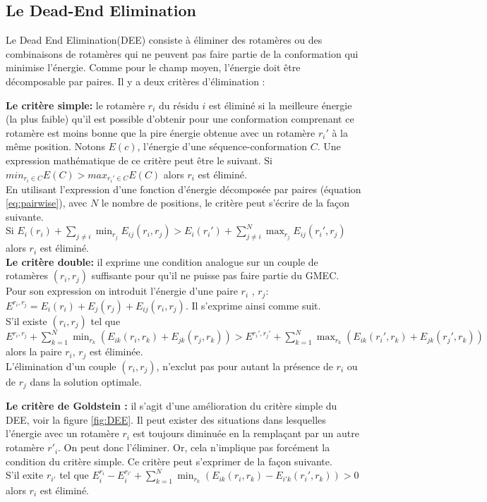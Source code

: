 \subsection{Le Dead-End Elimination}

Le \og Dead End Elimination\fg (DEE)  consiste à éliminer des rotamères ou des combinaisons de rotamères qui ne peuvent pas faire partie de la conformation qui minimise l'énergie. Comme pour le champ moyen, l'énergie doit être décomposable par paires. Il y a deux critères d'élimination \cite{Desmet92}:


\textbf{Le critère simple:} le rotamère $r_i$ du résidu $i$ est éliminé si la meilleure énergie (la plus faible) qu'il est possible d'obtenir pour une conformation comprenant ce rotamère est moins bonne que la pire énergie obtenue avec un rotamère $r_i'$  à la même position. Notons $E(c)$, l'énergie d'une séquence-conformation $C$. Une expression mathématique de ce critère peut être le suivant.
Si $min_{r_i \in C }E(C) > max_{r_i' \in C} E(C) $ alors $r_i$ est éliminé. \\
En utilisant l'expression d'une fonction d'énergie décomposée par paires (équation \vref{eq:pairwise}), avec $N$ le nombre de positions, le critère peut s'écrire de la façon suivante.\\
Si $E_i(r_i) + \sum_{j\neq i} \min_{r_j} E_{ij}(r_i,r_j) > E_i(r_i') + \sum_{j\neq i}^{N} \max_{r_j}E_{ij}(r_i',r_j)$ alors $r_i$ est éliminé.\\ 


\textbf{Le critère double:} il exprime une condition analogue sur un couple de rotamères $(r_i,r_j)$ suffisante pour qu'il ne puisse pas faire partie du GMEC. Pour son expression on introduit l'énergie d'une paire $r_i$ , $r_j$: $E^{r_i,r_j} = E_i(r_i) + E_j(r_j) + E_{ij}(r_i,r_j)$. Il s'exprime ainsi comme suit.\\
S'il existe $(r_i,r_j)$ tel que\\
$E^{r_i,r_j} + \sum_{k=1}^N \min_{r_k} (E_{ik}(r_i,r_k) + E_{jk}(r_j,r_k)) >  E^{r_i',r_j'} + \sum_{k=1}^N \max_{r_k} (E_{ik}(r_i',r_k) + E_{jk}(r_j',r_k))$ \\
alors la paire $r_i$, $r_j$ est éliminée.\\
L'élimination d'un couple $(r_i,r_j)$, n'exclut pas pour autant la présence de $r_i$ ou de $r_j$ dans la solution optimale. 

\textbf{Le critère de Goldstein \cite{Goldstein94}:} il s'agit d'une amélioration du critère simple du DEE, voir la figure \ref{fig:DEE}. Il peut exister des situations dans lesquelles l'énergie avec un rotamère $r_i$  est toujours diminuée en la remplaçant par un autre rotamère $r'_i$. On peut donc l'éliminer. Or, cela n'implique pas forcément la condition du critère simple. Ce critère peut s'exprimer de la façon suivante.\\
S'il exite $r_{i'}$ tel que $E_i^{r_i} - E_i^{r_{i'}}+ \sum_{k=1}^N \min_{r_k} (E_{ik}(r_i,r_k) - E_{i'k}(r_i',r_k)) > 0$ alors $r_i$ est éliminé.

